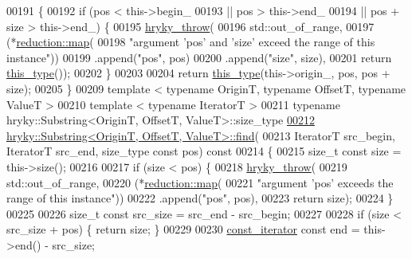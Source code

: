 \begin{DoxyCode}
00191 \textcolor{keyword}{}\{
00192     \textcolor{keywordflow}{if} (pos < this->begin\_
00193          || pos > this->end\_
00194          || pos + size > this->end\_) \{
00195         \hyperlink{debug__common_8h_af50606eac4009921527ddcaed392b2c2}{hryky_throw}(
00196             std::out\_of\_range,
00197             (*\hyperlink{namespacehryky_1_1reduction_ac5eae270cf8047b294dc4ff3e5e11a79}{reduction::map}(
00198                 \textcolor{stringliteral}{"argument 'pos' and 'size' exceed the range of this instance"}))
00199             .append(\textcolor{stringliteral}{"pos"},  pos)
00200             .append(\textcolor{stringliteral}{"size"}, size),
00201             \textcolor{keywordflow}{return} \hyperlink{classhryky_1_1_substring}{this_type}());
00202     \}
00203 
00204     \textcolor{keywordflow}{return} \hyperlink{classhryky_1_1_substring}{this_type}(this->origin\_, pos, pos + size);
00205 \}
00209 \textcolor{keyword}{template} < \textcolor{keyword}{typename} OriginT, \textcolor{keyword}{typename} OffsetT, \textcolor{keyword}{typename} ValueT >
00210 \textcolor{keyword}{template} < \textcolor{keyword}{typename} IteratorT >
00211 \textcolor{keyword}{typename} hryky::Substring<OriginT, OffsetT, ValueT>::size\_type 
\hypertarget{substring_8h_source_l00212}{}\hyperlink{classhryky_1_1_substring_a095d9b41e44fd8be92c16c7a9ab049bf}{00212} \hyperlink{classhryky_1_1_substring}{hryky::Substring<OriginT, OffsetT, ValueT>::find}(
00213     IteratorT src\_begin, IteratorT src\_end, size\_type \textcolor{keyword}{const} pos)\textcolor{keyword}{ const}
00214 \textcolor{keyword}{}\{
00215     \textcolor{keywordtype}{size\_t} \textcolor{keyword}{const} size       = this->size();
00216 
00217     \textcolor{keywordflow}{if} (size < pos) \{
00218         \hyperlink{debug__common_8h_af50606eac4009921527ddcaed392b2c2}{hryky_throw}(
00219             std::out\_of\_range,
00220             (*\hyperlink{namespacehryky_1_1reduction_ac5eae270cf8047b294dc4ff3e5e11a79}{reduction::map}(
00221                 \textcolor{stringliteral}{"argument 'pos' exceeds the range of this instance"}))
00222             .append(\textcolor{stringliteral}{"pos"}, pos),
00223             \textcolor{keywordflow}{return} size);
00224     \}
00225 
00226     \textcolor{keywordtype}{size\_t} \textcolor{keyword}{const} src\_size   = src\_end - src\_begin;
00227     
00228     \textcolor{keywordflow}{if} (size < src\_size + pos) \{ \textcolor{keywordflow}{return} size; \}
00229 
00230     \hyperlink{classhryky_1_1iterator_1_1random_1_1_immutable}{const_iterator} \textcolor{keyword}{const} end    = this->end() - src\_size;

\end{DoxyCode}
